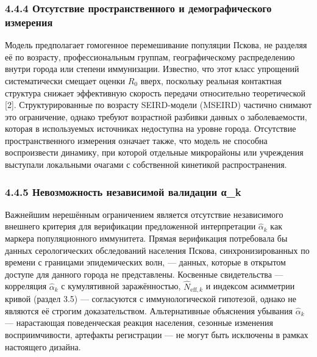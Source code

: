 \documentclass[12pt]{article}
\begin{document}
\subsubsection{4.4.4 Отсутствие пространственного и демографического
измерения}\label{ux43eux442ux441ux443ux442ux441ux442ux432ux438ux435-ux43fux440ux43eux441ux442ux440ux430ux43dux441ux442ux432ux435ux43dux43dux43eux433ux43e-ux438-ux434ux435ux43cux43eux433ux440ux430ux444ux438ux447ux435ux441ux43aux43eux433ux43e-ux438ux437ux43cux435ux440ux435ux43dux438ux44f}

Модель предполагает гомогенное перемешивание популяции Пскова, не
разделяя её по возрасту, профессиональным группам, географическому
распределению внутри города или степени иммунизации. Известно, что этот
класс упрощений систематически смещает оценки \(R_0\) вверх, поскольку
реальная контактная структура снижает эффективную скорость передачи
относительно теоретической {[}2{]}. Структурированные по возрасту
SEIRD-модели (MSEIRD) частично снимают это ограничение, однако требуют
возрастной разбивки данных о заболеваемости, которая в используемых
источниках недоступна на уровне города. Отсутствие пространственного
измерения означает также, что модель не способна воспроизвести динамику,
при которой отдельные микрорайоны или учреждения выступали локальными
очагами с собственной кинетикой распространения.

\subsubsection{4.4.5 Невозможность независимой валидации
α\_k}\label{ux43dux435ux432ux43eux437ux43cux43eux436ux43dux43eux441ux442ux44c-ux43dux435ux437ux430ux432ux438ux441ux438ux43cux43eux439-ux432ux430ux43bux438ux434ux430ux446ux438ux438-ux3b1_k}

Важнейшим нерешённым ограничением является отсутствие независимого
внешнего критерия для верификации предложенной интерпретации
\(\hat{\alpha}_k\) как маркера популяционного иммунитета. Прямая
верификация потребовала бы данных серологических обследований населения
Пскова, синхронизированных по времени с границами эпидемических волн,
--- данных, которые в открытом доступе для данного города не
представлены. Косвенные свидетельства --- корреляция \(\hat{\alpha}_k\)
с кумулятивной заражённостью, \(\hat{N}_{\text{eff},k}\) и индексом
асимметрии кривой (раздел 3.5) --- согласуются с иммунологической
гипотезой, однако не являются её строгим доказательством. Альтернативные
объяснения убывания \(\hat{\alpha}_k\) --- нарастающая поведенческая
реакция населения, сезонные изменения восприимчивости, артефакты
регистрации --- не могут быть исключены в рамках настоящего дизайна.
\end{document}
